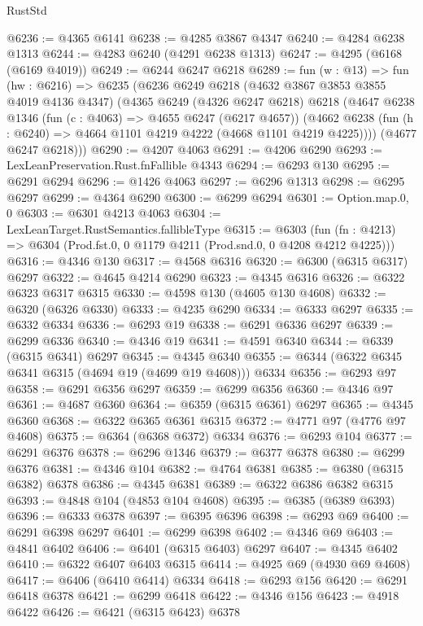 \begin{lexlean}{RustStd}
\begin{coremodule}
@6236 := @4365 @6141
@6238 := @4285 @3867 @4347
@6240 := @4284 @6238 @1313
@6244 := @4283 @6240 (@4291 @6238 @1313)
@6247 := @4295 (@6168 (@6169 @4019))
@6249 := @6244 @6247 @6218
@6289 := fun (w : @13) =>
  fun (hw : @6216) =>
  @6235
    (@6236
      @6249
      @6218
      (@4632 @3867 @3853 @3855 @4019 @4136 @4347)
      (@4365
        @6249
        (@4326 @6247 @6218)
        @6218
        (@4647
          @6238
          @1346
          (fun (c : @4063) => @4655 @6247 (@6217 @4657))
          (@4662 @6238 (fun (h : @6240) => @4664 @1101 @4219 @4222 (@4668 @1101 @4219 @4225))))
        (@4677 @6247 @6218)))
@6290 := @4207 @4063
@6291 := @4206 @6290
@6293 := LexLeanPreservation.Rust.fnFallible @4343
@6294 := @6293 @130
@6295 := @6291 @6294
@6296 := @1426 @4063
@6297 := @6296 @1313
@6298 := @6295 @6297
@6299 := @4364 @6290
@6300 := @6299 @6294
@6301 := Option.map.{0, 0}
@6303 := @6301 @4213 @4063
@6304 := LexLeanTarget.RustSemantics.fallibleType
@6315 := @6303
    (fun (fn : @4213) => @6304 (Prod.fst.{0, 0} @1179 @4211 (Prod.snd.{0, 0} @4208 @4212 @4225)))
@6316 := @4346 @130
@6317 := @4568 @6316
@6320 := @6300 (@6315 @6317) @6297
@6322 := @4645 @4214 @6290
@6323 := @4345 @6316
@6326 := @6322 @6323 @6317 @6315
@6330 := @4598 @130 (@4605 @130 @4608)
@6332 := @6320 (@6326 @6330)
@6333 := @4235 @6290
@6334 := @6333 @6297
@6335 := @6332 @6334
@6336 := @6293 @19
@6338 := @6291 @6336 @6297
@6339 := @6299 @6336
@6340 := @4346 @19
@6341 := @4591 @6340
@6344 := @6339 (@6315 @6341) @6297
@6345 := @4345 @6340
@6355 := @6344 (@6322 @6345 @6341 @6315 (@4694 @19 (@4699 @19 @4608))) @6334
@6356 := @6293 @97
@6358 := @6291 @6356 @6297
@6359 := @6299 @6356
@6360 := @4346 @97
@6361 := @4687 @6360
@6364 := @6359 (@6315 @6361) @6297
@6365 := @4345 @6360
@6368 := @6322 @6365 @6361 @6315
@6372 := @4771 @97 (@4776 @97 @4608)
@6375 := @6364 (@6368 @6372) @6334
@6376 := @6293 @104
@6377 := @6291 @6376
@6378 := @6296 @1346
@6379 := @6377 @6378
@6380 := @6299 @6376
@6381 := @4346 @104
@6382 := @4764 @6381
@6385 := @6380 (@6315 @6382) @6378
@6386 := @4345 @6381
@6389 := @6322 @6386 @6382 @6315
@6393 := @4848 @104 (@4853 @104 @4608)
@6395 := @6385 (@6389 @6393)
@6396 := @6333 @6378
@6397 := @6395 @6396
@6398 := @6293 @69
@6400 := @6291 @6398 @6297
@6401 := @6299 @6398
@6402 := @4346 @69
@6403 := @4841 @6402
@6406 := @6401 (@6315 @6403) @6297
@6407 := @4345 @6402
@6410 := @6322 @6407 @6403 @6315
@6414 := @4925 @69 (@4930 @69 @4608)
@6417 := @6406 (@6410 @6414) @6334
@6418 := @6293 @156
@6420 := @6291 @6418 @6378
@6421 := @6299 @6418
@6422 := @4346 @156
@6423 := @4918 @6422
@6426 := @6421 (@6315 @6423) @6378

\end{coremodule}
\end{lexlean}
